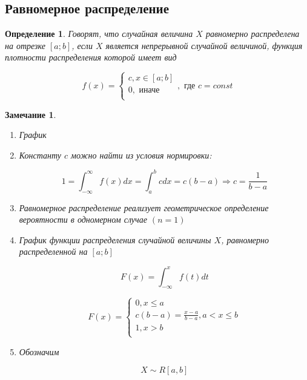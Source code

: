 \documentclass[a4paper, 14pt]{report}
\newtheorem{defenition}{Определение}[section]
\newtheorem{note}{Замечание}[section]
\begin{document}
\subsection{Равномерное распределение}

\begin{defenition}
    Говорят, что случайная величина $X$ равномерно распределена на отрезке $[a;b]$, если $X$ является непрерывной случайной величиной, функция плотности распределения которой имеет вид

    $$
    f(x) =
    \begin{cases}
        c, x \in [a;b] \\
        0, \text{ иначе} \\
    \end{cases}, \text{ где } c = const
    $$
\end{defenition}

\begin{note}
    \begin{enumerate}
        \item График
        \item Константу $c$ можно найти из условия нормировки:

            $$
            1 = \int_{-\infty}^\infty f(x) dx = \int_a^b c dx = c(b-a) \Rightarrow c = \frac{1}{b-a}
            $$

        \item Равномерное распределение реализует геометрическое определение вероятности в одномерном случае $(n=1)$

        \item График функции распределения случайной величины $X$, равномерно распределенной на $[a;b]$

            $$
            F(x) = \int_{-\infty}^x f(t)dt
            $$

            $$
            F(x) =
            \begin{cases}
                0, x \le a \\
                c(b-a) = \frac{x-a}{b-a}, a < x \le b \\
                1, x > b \\
            \end{cases}
            $$

        \item Обозначим

            $$
            X \sim R[a,b]
            $$
    \end{enumerate}
\end{note}
\end{document}
